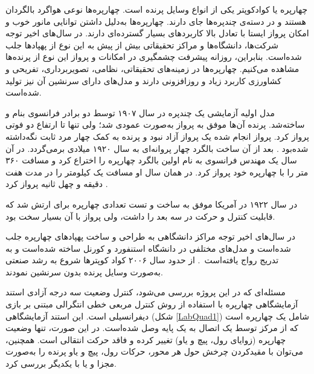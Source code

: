 


چهارپره یا کوادکوپتر یکی از انواع وسایل پرنده است. چهارپره‌ها نوعی هواگرد بالگردان هستند و در دسته‌ی چندپره‌ها جای دارند.
  چهارپره‌ها به‌دلیل داشتن توانایی مانور خوب و امکان پرواز ایستا با تعادل بالا کاربردهای بسیار گسترده‌ای دارند.
در سال‌های اخیر توجه شرکت‌ها، دانشگاه‌ها و مراکز تحقیقاتی بیش از پیش به این نوع از پهپادها جلب شده‌است. بنابراین، روزانه پیشرفت چشمگیری
 در امکانات و پرواز این نوع از پرنده‌ها مشاهده می‌کنیم. چهارپره‌ها در زمینه‌های تحقیقاتی، نظامی، تصویربرداری، تفریحی و کشاورزی کاربرد زیاد و روزافزونی دارند و مدل‌های دارای سرنشین آن نیز تولید شده‌است‌.





مدل‬ اولیه آزمایشی یک چندپره در سال ۱۹۰۷ توسط دو برادر فرانسوی بنام
  و 
  ساخته‌شد. پرنده آن‌ها موفق به پرواز به‌صورت عمودی شد؛ ولی تنها تا ارتفاع دو فوتی پرواز کرد. پرواز انجام شده یک پرواز آزاد
  نبود و پرنده به کمک چهار مرد ثابت نگه‌داشته شده‌بود \cite{Sprekelmeyer}.
  بعد از آن ساخت بالگرد چهار پروانه‌ای به سال ۱۹۲۰ میلادی برمی‌گردد. در آن سال یک مهندس فرانسوی به نام  اولین بالگرد چهارپره را اختراع کرد و مسافت ۳۶۰ متر را با چهارپره خود پرواز کرد. در همان سال او مسافت یک کیلومتر را در مدت هفت دقیقه و چهل ثانیه پرواز کرد \cite{10.2307/44729509}.

در  سال ۱۹۲۲ در آمریکا  موفق به ساخت و تست تعدادی چهارپره برای ارتش شد که قابلیت کنترل و حرکت در سه بعد را داشت، ولی پرواز با آن بسیار سخت بود.

در سال‌های اخیر توجه مراکز دانشگاهی به طراحی و ساخت پهپادهای چهارپره جلب شده‌است و مدل‌های مختلفی در دانشگاه استنفورد و کورنل ساخته شده‌است و به تدریج رواج یافته‌است~\cite{5717652}.
از حدود سال ۲۰۰۶ کواد کوپترها شروع به رشد صنعتی به‌صورت وسایل پرنده بدون سرنشین نمودند.


مسئله‌ای که در این پروژه بررسی می‌شود، کنترل وضعیت سه درجه آزادی استند آزمایشگاهی چهارپره با استفاده از روش کنترل مربعی خطی انتگرالی مبتنی بر بازی دیفرانسیلی است. این استند آزمایشگاهی (شکل \ref{LabQuad1}) شامل یک چهارپره است که از 
مرکز توسط یک اتصال به یک پایه وصل شده‌است. در این صورت، تنها وضعیت چهارپره (زوایای رول، پیچ و یاو) 
 تغییر کرده و فاقد حرکت انتقالی است. همچنین، می‌توان با مقیدکردن چرخش حول هر محور، 
حرکات رول، پیچ و یاو  پرنده را به‌صورت مجزا و یا با یکدیگر بررسی کرد.

